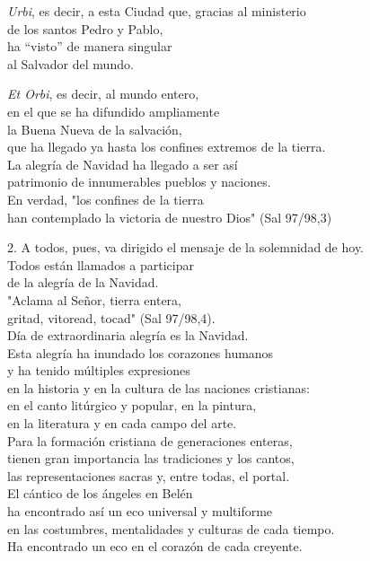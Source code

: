 \emph{Urbi}, es decir, a esta Ciudad que, gracias al ministerio\\
de los santos Pedro y Pablo,\\
ha ``visto'' de manera singular\\
al Salvador del mundo.

\emph{Et Orbi}, es decir, al mundo entero,\\
en el que se ha difundido ampliamente\\
la Buena Nueva de la salvación,\\
que ha llegado ya hasta los confines extremos de la tierra.\\
La alegría de Navidad ha llegado a ser así\\
patrimonio de innumerables pueblos y naciones.\\
En verdad, "los confines de la tierra\\
han contemplado la victoria de nuestro Dios" (Sal 97/98,3)

2. A todos, pues, va dirigido el mensaje de la solemnidad de hoy.\\
Todos están llamados a participar\\
de la alegría de la Navidad.\\
"Aclama al Señor, tierra entera,\\
gritad, vitoread, tocad" (Sal 97/98,4).\\
Día de extraordinaria alegría es la Navidad.\\
Esta alegría ha inundado los corazones humanos\\
y ha tenido múltiples expresiones\\
en la historia y en la cultura de las naciones cristianas:\\
en el canto litúrgico y popular, en la pintura,\\
en la literatura y en cada campo del arte.\\
Para la formación cristiana de generaciones enteras,\\
tienen gran importancia las tradiciones y los cantos,\\
las representaciones sacras y, entre todas, el portal.\\
El cántico de los ángeles en Belén\\
ha encontrado así un eco universal y multiforme\\
en las costumbres, mentalidades y culturas de cada tiempo.\\
Ha encontrado un eco en el corazón de cada creyente.

